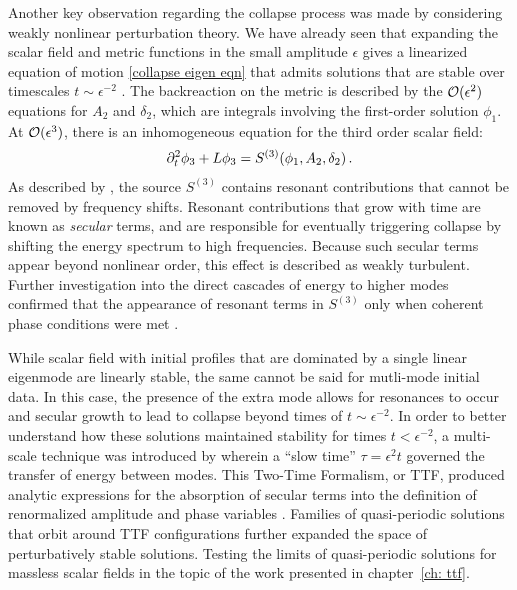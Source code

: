 \documentclass[../PhD.tex]{subfiles}
\begin{document}
Another key observation regarding the collapse process was made by considering weakly nonlinear perturbation theory. We have already seen that expanding the scalar field and metric functions in the small amplitude $\epsilon$ gives a linearized equation of motion \eqref{collapse eigen eqn} that admits solutions that are stable over timescales $t \sim \epsilon^{-2}$ \cite{1309.1629, 1401.4093, 1503.07746}. The backreaction on the metric is described by the $\mathcal O(\epsilon^2)$ equations for $A_2$ and $\delta_2$, which are integrals involving the first-order solution $\phi_1$. At $\mathcal O(\epsilon^3)$, there is an inhomogeneous equation for the third order scalar field:
\begin{align}
\partial_t^2 \phi_3 + L \phi_3 = S^{(3)}(\phi_1, A_2, \delta_2) \, .
\end{align}
As described by \cite{1104.3702}, the source $S^{(3)}$ contains resonant contributions that cannot be removed by frequency shifts. Resonant contributions that grow with time are known as \emph{secular} terms, and are responsible for eventually triggering collapse by shifting the energy spectrum to high frequencies. Because such secular terms appear beyond nonlinear order, this effect is described as weakly turbulent. Further investigation into the direct cascades of energy to higher modes confirmed that the appearance of resonant terms in $S^{(3)}$ only when coherent phase conditions were met \cite{1512.04383, 1512.00349, 1509.00232}.

While scalar field with initial profiles that are dominated by a single linear eigenmode are linearly stable, the same cannot be said for mutli-mode initial data. In this case, the presence of the extra mode allows for resonances to occur and secular growth to lead to collapse beyond times of $t \sim \epsilon^{-2}$. In order to better understand how these solutions maintained stability for times $t < \epsilon^{-2}$, a multi-scale technique was introduced by \cite{1403.6471} wherein a ``slow time'' $\tau = \epsilon^2 t$ governed the transfer of energy between modes. This Two-Time Formalism, or TTF, produced analytic expressions for the absorption of secular terms into the definition of renormalized amplitude and phase variables \cite{1412.3249, 1412.4761,1510.07836}. Families of quasi-periodic solutions that orbit around TTF configurations further expanded the space of perturbatively stable solutions\cite{1410.2631, 1507.08261,  1706.07413, TTF}. Testing the limits of quasi-periodic solutions for massless scalar fields in the topic of the work presented in chapter~\ref{ch: ttf}.
\end{document}
